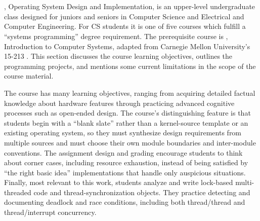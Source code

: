 \section{\fourten}
\label{sec:410}

\fourten, Operating System Design and Implementation,
is an upper-level undergraduate class
designed for juniors and seniors in Computer Science
and Electrical and Computer Engineering.
For CS students it is one of five courses which fulfill
a ``systems programming'' degree requirement.
%
The prerequisite course is \twothirteen,
Introduction to Computer Systems,
adapted from Carnegie Mellon University's 15-213
\cite{sigcse01:CSaPP}.
This section discusses the course learning objectives,
outlines the programming projects,
and mentions some current limitations in the scope
of the course material.

The course has many learning objectives,
ranging from acquiring detailed factual knowledge about
hardware features
through practicing advanced cognitive processes
such as open-ended design.
%
The course's distinguishing feature is that
students begin with a ``blank slate'' rather than a
kernel-source template or an existing operating system,
so they must synthesize design requirements from multiple sources
and must
choose their own module boundaries and inter-module conventions.
%
The assignment design and grading encourage students to
think about corner cases, including resource exhaustion,
instead of being satisfied by
``the right basic idea''
implementations that handle only auspicious situations.
%
Finally, most relevant to this work,
students %
analyze and write lock-based multi-threaded code and
thread-synchronization objects.
They practice detecting and documenting deadlock and race conditions,
including both thread/thread
and thread/interrupt concurrency.



